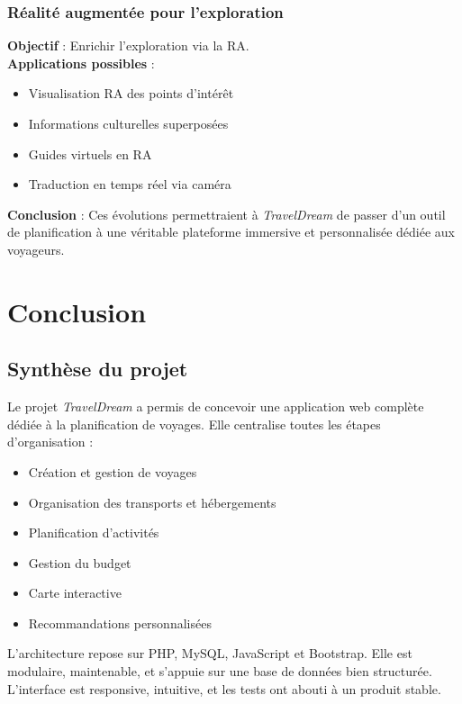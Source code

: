 \documentclass[a4paper,12pt]{article}
\begin{document}
\subsubsection{Réalité augmentée pour l'exploration}
\textbf{Objectif} : Enrichir l'exploration via la RA.\\
\textbf{Applications possibles} :
\begin{itemize}
  \item Visualisation RA des points d’intérêt
  \item Informations culturelles superposées
  \item Guides virtuels en RA
  \item Traduction en temps réel via caméra
\end{itemize}

\textbf{Conclusion} : Ces évolutions permettraient à \textit{TravelDream} de passer d’un outil de planification à une véritable plateforme immersive et personnalisée dédiée aux voyageurs.
\section{Conclusion}

\subsection{Synthèse du projet}
Le projet \textit{TravelDream} a permis de concevoir une application web complète dédiée à la planification de voyages. Elle centralise toutes les étapes d’organisation : 
\begin{itemize}
  \item Création et gestion de voyages
  \item Organisation des transports et hébergements
  \item Planification d’activités
  \item Gestion du budget
  \item Carte interactive
  \item Recommandations personnalisées
\end{itemize}
L’architecture repose sur PHP, MySQL, JavaScript et Bootstrap. Elle est modulaire, maintenable, et s’appuie sur une base de données bien structurée. L’interface est responsive, intuitive, et les tests ont abouti à un produit stable.
\end{document}
